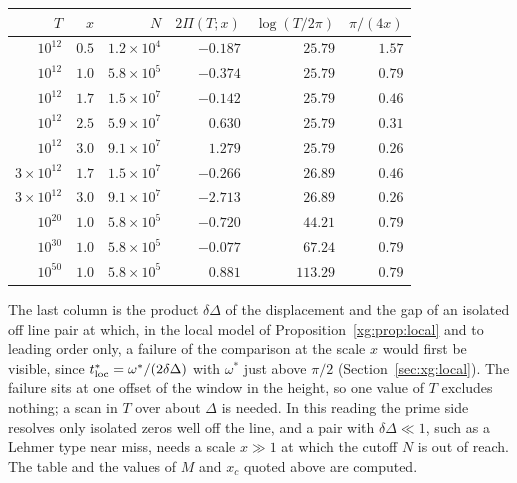 \begin{center}
\small\setlength{\tabcolsep}{4pt}
\begin{tabular}{rrrrrr}
\toprule
$T$ & $x$ & $N$ & $2\Pi(T;x)$ & $\log(T/2\pi)$ & $\pi/(4x)$\\
\midrule
$10^{12}$ & $0.5$ & $1.2\times10^4$ & $-0.187$ & $25.79$ & $1.57$\\
$10^{12}$ & $1.0$ & $5.8\times10^5$ & $-0.374$ & $25.79$ & $0.79$\\
$10^{12}$ & $1.7$ & $1.5\times10^7$ & $-0.142$ & $25.79$ & $0.46$\\
$10^{12}$ & $2.5$ & $5.9\times10^7$ & $0.630$ & $25.79$ & $0.31$\\
$10^{12}$ & $3.0$ & $9.1\times10^7$ & $1.279$ & $25.79$ & $0.26$\\
$3\times10^{12}$ & $1.7$ & $1.5\times10^7$ & $-0.266$ & $26.89$ & $0.46$\\
$3\times10^{12}$ & $3.0$ & $9.1\times10^7$ & $-2.713$ & $26.89$ & $0.26$\\
$10^{20}$ & $1.0$ & $5.8\times10^5$ & $-0.720$ & $44.21$ & $0.79$\\
$10^{30}$ & $1.0$ & $5.8\times10^5$ & $-0.077$ & $67.24$ & $0.79$\\
$10^{50}$ & $1.0$ & $5.8\times10^5$ & $0.881$ & $113.29$ & $0.79$\\
\bottomrule
\end{tabular}
\end{center}

The last column is the product $\delta\Delta$ of the displacement and the gap of an isolated off line pair at which, in the local model of Proposition~\ref{xg:prop:local} and to leading order only, a failure of the comparison at the scale $x$ would first be visible, since $t^*_{\rm loc}=\omega^*/(2\delta\Delta)$ with $\omega^*$ just above $\pi/2$ (Section~\ref{sec:xg:local}). The failure sits at one offset of the window in the height, so one value of $T$ excludes nothing; a scan in $T$ over about $\Delta$ is needed. In this reading the prime side resolves only isolated zeros well off the line, and a pair with $\delta\Delta\ll1$, such as a Lehmer type near miss, needs a scale $x\gg1$ at which the cutoff $N$ is out of reach. The table and the values of $M$ and $x_c$ quoted above are computed.
